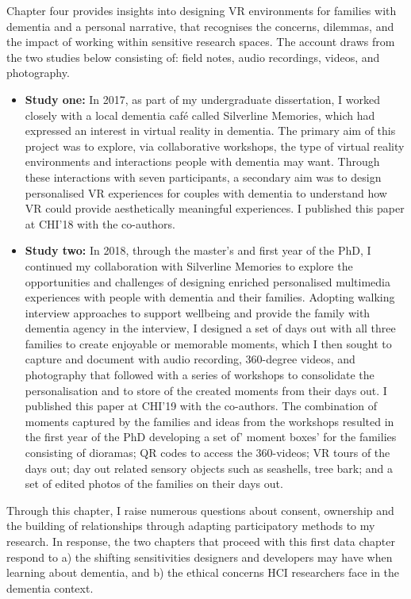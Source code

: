 Chapter four provides insights into designing VR environments for families with dementia and a personal narrative, that recognises the concerns, dilemmas, and the impact of working within sensitive research spaces. The account draws from the two studies below consisting of: field notes, audio recordings, videos, and photography. 
\begin{itemize}
    \item \textbf{Study one:} In 2017, as part of my undergraduate dissertation, I worked closely with a local dementia café called Silverline Memories, which had expressed an interest in virtual reality in dementia. The primary aim of this project was to explore, via collaborative workshops, the type of virtual reality environments and interactions people with dementia may want. Through these interactions with seven participants, a secondary aim was to design personalised VR experiences for couples with dementia to understand how VR could provide aesthetically meaningful experiences. I published this paper at CHI'18 with the co-authors.

    \item \textbf{Study two:} In 2018, through the master's and first year of the PhD, I continued my collaboration with Silverline Memories to explore the opportunities and challenges of designing enriched personalised multimedia experiences with people with dementia and their families. Adopting walking interview approaches to support wellbeing and provide the family with dementia agency in the interview, I designed a set of days out with all three families to create enjoyable or memorable moments, which I then sought to capture and document with audio recording, 360-degree videos, and photography that followed with a series of workshops to consolidate the personalisation and to store of the created moments from their days out. I published this paper at CHI'19 with the co-authors. The combination of moments captured by the families and ideas from the workshops resulted in the first year of the PhD developing a set of' moment boxes' for the families consisting of dioramas; QR codes to access the 360-videos; VR tours of the days out; day out related sensory objects such as seashells, tree bark; and a set of edited photos of the families on their days out.

\end{itemize}

Through this chapter, I raise numerous questions about consent, ownership and the building of relationships through adapting participatory methods to my research. In response, the two chapters that proceed with this first data chapter respond to a) the shifting sensitivities designers and developers may have when learning about dementia, and b) the ethical concerns HCI researchers face in the dementia context.

